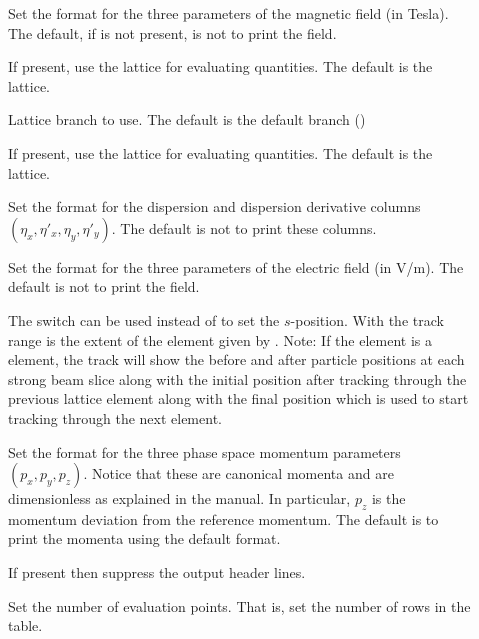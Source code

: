 {{{{{{{{{{\begin{description}
\item[] \Newline
Set the format for the three parameters of the magnetic field (in Tesla). The default, if
 is not present, is not to print the field.
%
\item[] \Newline
If present, use the  lattice for evaluating quantities. The default is the 
lattice.
%
\item[] \Newline
Lattice branch to use. The default is the default branch ()
%
\item[] \Newline
If present, use the  lattice for evaluating quantities. The default is the 
lattice.
%
\item[] \Newline
Set the format for the dispersion and dispersion derivative columns $(\eta_x, \eta'_x, \eta_y, \eta'_y)$. 
The default is not to print these columns.
%
\item[] \Newline
Set the format for the three parameters of the electric field (in V/m). The default is not to print
the field.
%
\item[] \Newline
The  switch can be used instead of  to set the $s$-position. With
 the track range is the extent of the element given by . Note: If the
element is a  element, the track will show the before and after particle positions at
each strong beam slice along with the initial position after tracking through the previous lattice
element along with the final position which is used to start tracking through the next element.
%
\item[] \Newline
Set the format for the three phase space momentum parameters $(p_x, p_y, p_z)$. Notice that these
are canonical momenta and are dimensionless as explained in the \bmad manual. In particular, $p_z$
is the momentum deviation from the reference momentum. The default is to print the momenta using the
default format.
%
\item[] \Newline
If present then suppress the output header lines.
%
\item[] \Newline
Set the number of evaluation points. That is, set the number of rows in the table.
%
\item[] \Newline

\end{description}}}}}}}}}}}
